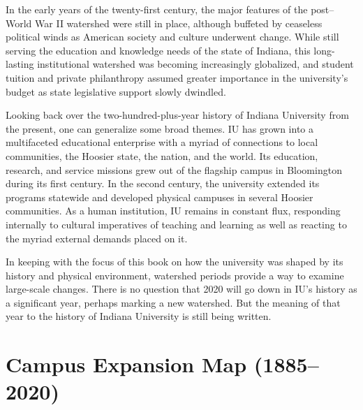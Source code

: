 \documentclass[
  american,
  letterpaper,
]{scrreprt}
\begin{document}
In the early years of the twenty-first century, the major features of
the post--World War II watershed were still in place, although buffeted
by ceaseless political winds as American society and culture underwent
change. While still serving the education and knowledge needs of the
state of Indiana, this long-lasting institutional watershed was becoming
increasingly globalized, and student tuition and private philanthropy
assumed greater importance in the university's budget as state
legislative support slowly dwindled.

Looking back over the two-hundred-plus-year history of Indiana
University from the present, one can generalize some broad themes. IU
has grown into a multifaceted educational enterprise with a myriad of
connections to local communities, the Hoosier state, the nation, and the
world. Its education, research, and service missions grew out of the
flagship campus in Bloomington during its first century. In the second
century, the university extended its programs statewide and developed
physical campuses in several Hoosier communities. As a human
institution, IU remains in constant flux, responding internally to
cultural imperatives of teaching and learning as well as reacting to the
myriad external demands placed on it.

In keeping with the focus of this book on how the university was shaped
by its history and physical environment, watershed periods provide a way
to examine large-scale changes. There is no question that 2020 will go
down in IU's history as a significant year, perhaps marking a new
watershed. But the meaning of that year to the history of Indiana
University is still being written.


\chapter*{Campus Expansion Map
(1885--2020)}\label{campus-expansion-map-18852020}

\end{document}
